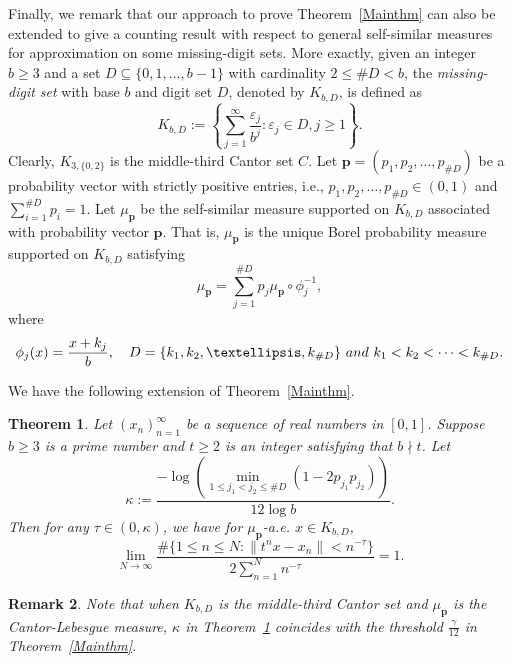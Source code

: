 \documentclass[10pt,a4paper]{amsart}
\numberwithin{equation}{section} %
\newtheorem{thm}{Theorem}[section]
\newtheorem{rem}[thm]{Remark}
\begin{document}
Finally, we remark that our approach to prove Theorem~\ref{Mainthm} can also be extended to  give a counting result with respect to general  self-similar measures for approximation on some missing-digit sets. More exactly, given an integer $b\geq 3$ and a set  $D\subseteq\{0,1,\ldots,b-1\}$ with cardinality  $2\leq \#D<b$, the {\em missing-digit set} with base $b$ and digit set $D$, denoted by $K_{b,D}$, is defined as
\[K_{b,D}:=\left\{\sum_{j=1}^{\infty}\frac{\varepsilon_j}{b^j}: \varepsilon_j\in D, j\geq 1\right\}.\]
Clearly, $K_{3,\{0,2\}}$ is the middle-third Cantor set $C$. Let $\mathbf{p}=(p_{1},p_{2},\ldots,p_{\#D})$ be a probability vector with strictly positive entries, i.e., $p_{1},p_{2},\ldots,p_{\#D}\in(0,1)$ and $\sum_{i=1}^{\#D}p_{i}=1$. Let $\mu_{\mathbf{p}}$ be the self-similar measure supported on $K_{b,D}$ associated with probability vector $\textbf{p}$. That is, $\mu_{\textbf{p}}$ is the unique Borel probability measure supported on $K_{b,D}$ satisfying 
\[\mu_{\mathbf{p}}=\sum_{j=1}^{\#D}p_j\mu_{\mathbf{p}}\circ\phi_j^{-1},\]
where 
\[\phi_j(x)=\frac{x+k_j}{b}, \quad D=\{k_1,k_2,\ldots, k_{\#D}\}\ {\rm and}\  k_1<k_2<\cdots<k_{\#D}.\]

We have the following extension of Theorem~\ref{Mainthm}.
\begin{thm}\label{thmsselfsimilar}
	Let $(x_{n})_{n=1}^{\infty}$ be a sequence of real numbers in $[0,1]$. Suppose $b\geq3$ is a prime number and $t\geq2$ is an integer satisfying that $b\nmid t$. Let  $$\kappa :=\frac{-\log\left(\min\limits_{1\leq j_{1}<j_{2}\leq\#D}(1-2p_{j_{1}}p_{j_{2}})\right)}{12\log b}.$$ Then for any $\tau\in(0,\kappa)$, we have for $\mu_{\textbf{p}}$-a.e. $x\in K_{b,D}$,
	$$\lim_{N\to\infty}\frac{\#\{1\leq n\leq N:\|t^{n}x-x_{n}\|<n^{-\tau}\}}{2\sum_{n=1}^{N}n^{-\tau}}=1.$$
\end{thm}

\begin{rem}
Note that when $K_{b,D}$ is the middle-third Cantor set and $\mu_{\textbf{p}}$ is the Cantor-Lebesgue measure, $\kappa$ in Theorem~\ref{thmsselfsimilar} coincides with the threshold $\frac{\gamma}{12}$ in Theorem~\ref{Mainthm}. 
\end{rem}
\end{document}
